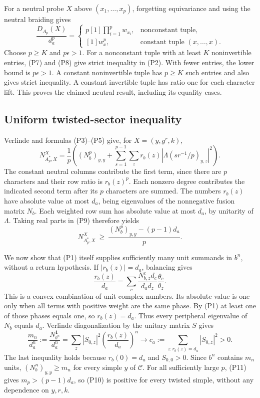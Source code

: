 \documentclass[10pt]{amsart}
\newcommand{\one}{\mathbf1}\newcommand{\C}{\mathcal C}
\begin{document}
For a neutral probe $X$ above $(x_1,\ldots,x_p)$,
forgetting equivariance and using the neutral braiding gives
\[
 \frac{D_{A_p}(X)}{d_a^p}
   =\begin{cases}
      p[1]\prod_{i=1}^p w_{x_i},&\text{nonconstant tuple},\\
      [1]w_x^p,&\text{constant tuple }(x,\ldots,x).
     \end{cases}                                               \tag{P8}
\]
Choose $p\ge K$ and $p\epsilon>1$.
For a nonconstant tuple with at least $K$ noninvertible
entries, (P7) and (P8) give strict inequality in (P2).
With fewer entries, the lower bound is $p\epsilon>1$.
A constant noninvertible tuple has $p\ge K$ such entries
and also gives strict inequality. A constant invertible
tuple has ratio one for each character lift. This proves
the claimed neutral result, including its equality cases.

\subsection{Uniform twisted-sector inequality}
Verlinde and formulas (P3)--(P5) give, for $X=(y,g^r,k)$,
\[
 N_{A_p^*,X}^{X}
  =\frac1p\left((N_b^p)_{y,y}
       +\sum_{s=1}^{p-1}\sum_z r_b(z)
                    |\Lambda(sr^{-1}/p)_{y,z}|^2\right).
                                                               \tag{P9}
\]
The constant neutral columns contribute the first term,
since there are $p$ characters and their row ratio is
$r_b(z)^p$. Each nonzero degree contributes the indicated
second term after its $p$ characters are summed.
The numbers $r_b(z)$ have absolute value at most
$d_a$, being eigenvalues of the nonnegative fusion matrix
$N_b$. Each weighted row sum has absolute value at most
$d_a$, by unitarity of $\Lambda$. Taking real parts in (P9)
therefore yields
\[
 N_{A_p^*,X}^{X}\ \ge\
      \frac{(N_b^p)_{y,y}-(p-1)d_a}{p}.                         \tag{P10}
\]

We now show that (P1) itself supplies sufficiently many unit
summands in $b^n$, without a return hypothesis. If
$|r_b(z)|=d_a$, balancing gives
\[
 \frac{r_b(z)}{d_a}
     =\sum_c\frac{N_{b,z}^c d_c}{d_a d_z}
                       \frac{\theta_c}{\theta_z}.
\]
This is a convex combination of unit complex numbers.
Its absolute value is one only when all terms with
positive weight are the same phase. By (P1) at least
one of those phases equals one, so $r_b(z)=d_a$.
Thus every peripheral eigenvalue of $N_b$ equals $d_a$.
Verlinde diagonalization by the unitary matrix $S$ gives
\[
 \frac{m_n}{d_a^n}:=
 \frac{N_{b^n}^{\one}}{d_a^n}
   =\sum_z |S_{0,z}|^2\left(\frac{r_b(z)}{d_a}\right)^n
     \longrightarrow c_a:=\sum_{z:r_b(z)=d_a}|S_{0,z}|^2>0.
                                                               \tag{P11}
\]
The last inequality holds because $r_b(0)=d_a$ and
$S_{0,0}>0$. Since $b^n$ contains $m_n$ units,
$(N_b^n)_{y,y}\ge m_n$ for every simple $y$ of $\C$.
For all sufficiently large $p$, (P11) gives
$m_p>(p-1)d_a$, so (P10) is positive for every twisted
simple, without any dependence on $y,r,k$.
\end{document}
